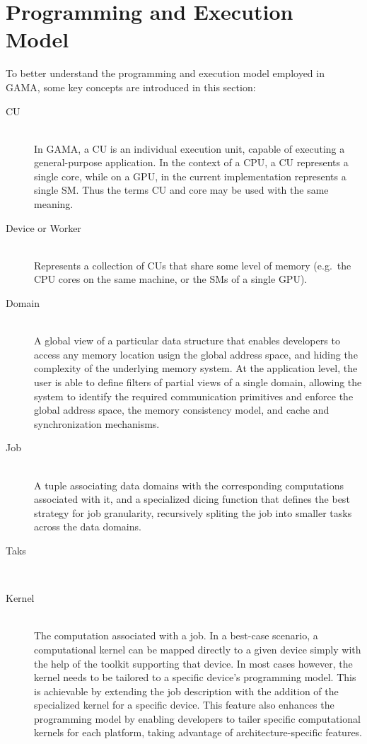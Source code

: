 \documentclass[main.tex]{subfiles}
\begin{document}
\section{Programming and Execution Model}

To better understand the programming and execution model employed in \ac{GAMA}, some key concepts are introduced in this section:

\begin{description}
  \item[\acf{CU}] \hfill \\
    In \ac{GAMA}, a \acl{CU} is an individual execution unit, capable of executing a general-purpose application. In the context of a \ac{CPU}, a \acl{CU} represents a single core, while on a \ac{GPU}, in the current implementation represents a single \acf{SM}. Thus the terms \ac{CU} and core may be used with the same meaning.

  \item[Device or Worker] \hfill \\
    Represents a collection of \aclp{CU} that share some level of memory (e.g.\ the CPU cores on the same machine, or the \acp{SM}  of a single \ac{GPU}).

  \item[Domain] \hfill \\
    A global view of a particular data structure that enables developers to access any memory location usign the global address space, and hiding the complexity of the underlying memory system. At the application level, the user is able to define filters of partial views of a single domain, allowing the system to identify the required communication primitives and enforce the global address space, the memory consistency model, and cache and synchronization mechanisms.

  \item[Job] \hfill \\
    A tuple associating data domains with the corresponding computations associated with it, and a specialized dicing function that defines the best strategy for job granularity, recursively spliting the job into smaller tasks across the data domains.

  \item[Taks] \hfill \\

  \item[Kernel] \hfill \\
    The computation associated with a job. In a best-case scenario, a computational kernel can be mapped directly to a given device simply with the help of the toolkit supporting that device. In most cases however, the kernel needs to be tailored to a specific device's programming model. This is achievable by extending the job description with the addition of the specialized kernel for a specific device. This feature also enhances the programming model by enabling developers to tailer specific computational kernels for each platform, taking advantage of architecture-specific features.


\end{description}
\end{document}
